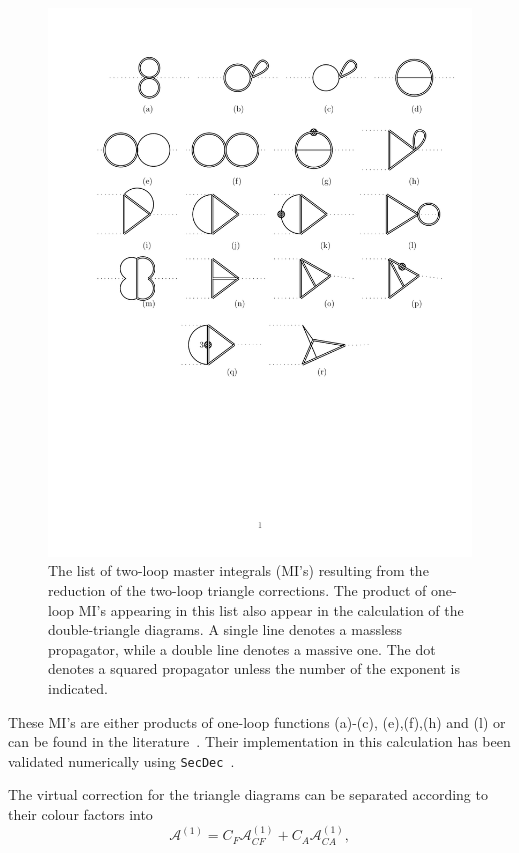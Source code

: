 \begin{figure}[htpb!]
	\begin{center}
		\includegraphics[width=12cm]{./figures/MI}
		\caption{ The list of two-loop master integrals (MI's) resulting from the reduction of the two-loop triangle corrections. The product of one-loop MI's appearing in this list also appear in the calculation of the double-triangle diagrams. A single line denotes a massless propagator, while a double line denotes a massive one. The dot denotes a squared propagator unless the number of the exponent is indicated.}
		\label{fig:trimis}
	\end{center}
\end{figure}
These MI's are either products of one-loop functions (a)-(c), (e),(f),(h) and (l) or can be found in the literature~\cite{Bonciani:2003hc,Aglietti:2006tp}. Their implementation in this calculation has been validated numerically using \texttt{SecDec}~\cite{Borowka:2013cma,Borowka:2015mxa}.  
\par The virtual correction for the triangle diagrams can be separated according to their colour factors into
\begin{equation}
	\mathcal A ^{(1)}   = C_F \mathcal A_{CF} ^{(1)}  + C_A \mathcal A_{CA} ^{(1)},
\end{equation}
